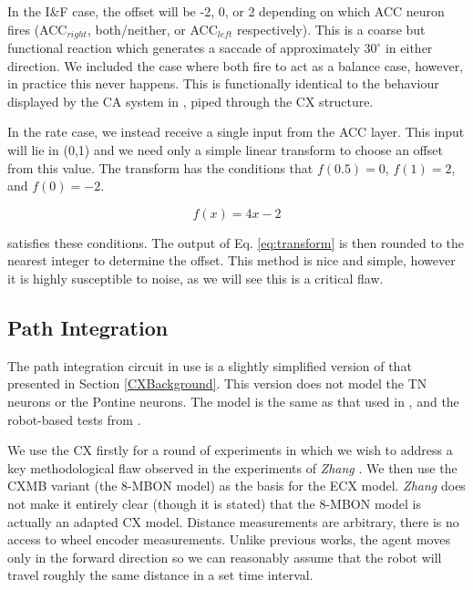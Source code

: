 \documentclass[a4paper,11pt,twoside,openright]{article}
\begin{document}
In the I\&F case, the offset will be -2, 0, or 2 depending on which
ACC neuron fires (ACC$_{right}$, both/neither, or ACC$_{left}$
respectively). This is a coarse but functional reaction which
generates a saccade of approximately $30^{\circ}$ in either
direction. We included the case where both fire to act as a balance
case, however, in practice this never happens. This is functionally
identical to the behaviour displayed by the CA system in
\cite{Mitchell2018}, piped through the CX structure.
\newline\par

In the rate case, we instead receive a single input from the ACC layer.
This input will lie in (0,1) and we need only a simple linear transform to
choose an offset from this value. The transform has the conditions that
$f(0.5) = 0$, $f(1) = 2$, and $f(0) = -2$.

\begin{equation}
  \label{eq:transform}
 f(x) = 4x - 2
\end{equation}

satisfies these conditions. The output of Eq. \ref{eq:transform} is then rounded
to the nearest integer to determine the offset. This method is nice and simple,
however it is highly susceptible to noise, as we will see this is a critical
flaw.


\subsection{ Path Integration }
The path integration circuit in use is a slightly simplified version of that
presented in Section \ref{CXBackground}. This version does not model the
TN neurons or the Pontine neurons. The model is the same as that used in
\cite{Scimeca2017, Zhang2017}, and the robot-based tests from \cite{Stone2017}.
\newline\par

We use the CX firstly for a round of experiments in which we wish to address a
key methodological flaw observed in the experiments of \textit{Zhang}
\cite{Zhang2017}. We then use the CXMB variant (the 8-MBON model)
as the basis for the ECX model. \textit{Zhang} does not make it entirely clear
(though it is stated) that the 8-MBON model is actually an adapted CX model.
Distance measurements are arbitrary, there is no access to wheel encoder
measurements. Unlike previous works, the agent moves only in the forward
direction so we can reasonably assume that the robot will travel roughly the same
distance in a set time interval.
\end{document}

